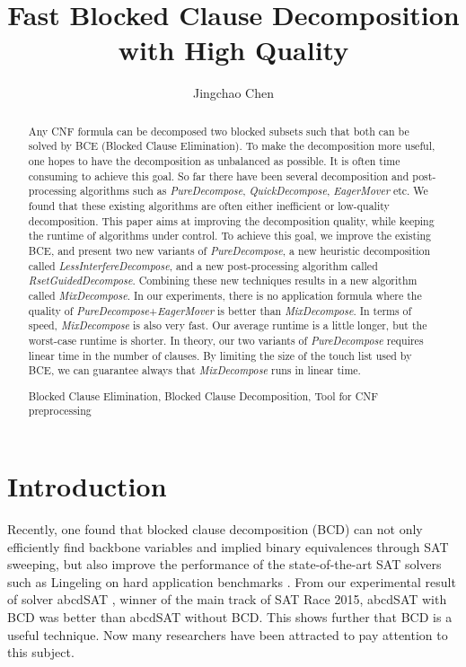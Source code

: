 \documentclass{llncs}
\newcommand{\keywords}[1]{\par\addvspace\baselineskip
\noindent\keywordname\enspace\ignorespaces#1}
\begin{document}
\title{Fast Blocked Clause Decomposition with High Quality}

\author{Jingchao Chen}

\maketitle
\begin{abstract}

Any CNF formula can be decomposed two blocked subsets such that both
can be solved by BCE (Blocked Clause Elimination). To make the
decomposition more useful, one hopes to have the decomposition as
unbalanced as possible. It is often time consuming to achieve this
goal. So far there have been several decomposition and
post-processing algorithms such as \emph{PureDecompose},
\emph{QuickDecompose}, \emph{EagerMover} etc. We found that these
existing algorithms are often either inefficient or low-quality
decomposition. This paper aims at improving the decomposition
quality, while keeping the runtime of algorithms under control. To
achieve this goal, we improve the existing BCE, and present two new
variants of \emph{PureDecompose}, a new heuristic decomposition
called \emph{LessInterfereDecompose}, and a new post-processing
algorithm called \emph{RsetGuidedDecompose}. Combining these new
techniques results in a new algorithm called \emph{MixDecompose}. In
our experiments, there is no application formula where the quality
of \emph{PureDecompose}+\emph{EagerMover} is better than
\emph{MixDecompose}.  In terms of speed, \emph{MixDecompose} is also
very fast. Our average runtime is a
 little longer, but the worst-case runtime is shorter.
 In theory, our two variants of
\emph{PureDecompose} requires linear time in the number of clauses.
By limiting the size of the touch list used by BCE, we can guarantee
always that \emph{MixDecompose} runs in linear time.

\keywords{Blocked Clause Elimination, Blocked Clause Decomposition,
Tool for CNF preprocessing}
\end{abstract}

\section{Introduction}
Recently, one found that blocked clause decomposition (BCD) can not
only efficiently find backbone variables \cite{backbone:97} and
implied binary equivalences through SAT sweeping, but also improve
the performance of the state-of-the-art SAT solvers such as
Lingeling \cite{Lingeling:13} on hard application benchmarks
\cite{sbliter:13,EagerMover:14}. From our experimental result of solver abcdSAT \cite{abcdSAT},
winner of the main track of SAT Race 2015, abcdSAT with BCD was better than abcdSAT without BCD.
 This shows further that BCD is a useful technique.
 Now many researchers have been attracted
to pay attention to this subject.
\end{document}
